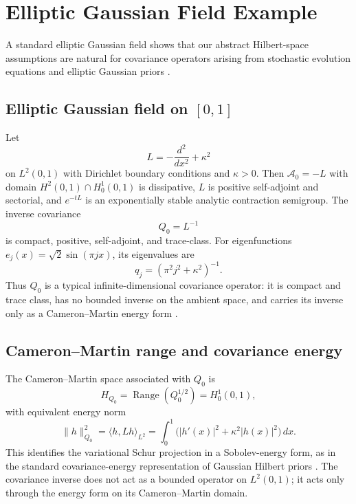 \documentclass[preprint,12pt]{elsarticle}
\theoremstyle{plain}
\theoremstyle{definition}
\theoremstyle{remark}
\begin{document}
    \section{Elliptic Gaussian Field Example}
    \label{sec:spde}

    A standard elliptic Gaussian field shows that our abstract Hilbert-space assumptions are natural for covariance operators arising from stochastic evolution equations and elliptic Gaussian priors \cite{daprato2014stochastic,lord2014introduction,stuart2010inverse,henderson2022sobolev}.

    \subsection{Elliptic Gaussian field on \texorpdfstring{$[0,1]$}{[0,1]}}

    Let
    \[
    L=-\frac{d^2}{dx^2}+\kappa^2
    \]
    on $L^2(0,1)$ with Dirichlet boundary conditions and $\kappa>0$. Then $\mathcal{A}_0=-L$ with domain $H^2(0,1)\cap H_0^1(0,1)$ is dissipative, $L$ is positive self-adjoint and sectorial, and $e^{-tL}$ is an exponentially stable analytic contraction semigroup. The inverse covariance
    \[
    Q_0=L^{-1}
    \]
    is compact, positive, self-adjoint, and trace-class. For eigenfunctions $e_j(x)=\sqrt{2}\sin(\pi jx)$, its eigenvalues are
    \[
    q_j=(\pi^2j^2+\kappa^2)^{-1}.
    \]
    Thus $Q_0$ is a typical infinite-dimensional covariance operator: it is compact and trace class, has no bounded inverse on the ambient space, and carries its inverse only as a Cameron--Martin energy form \cite{bogachev1998gaussian,simon2005trace,henderson2022sobolev}.

    \subsection{Cameron--Martin range and covariance energy}

    The Cameron--Martin space associated with $Q_0$ is
    \[
    H_{Q_0}=\operatorname{Range}(Q_0^{1/2})=H_0^1(0,1),
    \]
    with equivalent energy norm
    \[
    \|h\|_{Q_0}^2
    =\langle h,Lh\rangle_{L^2}
    =\int_0^1 \bigl(|h'(x)|^2+\kappa^2|h(x)|^2\bigr)\,dx.
    \]
    This identifies the variational Schur projection in a Sobolev-energy form, as in the standard covariance-energy representation of Gaussian Hilbert priors \cite{bogachev1998gaussian,stuart2010inverse,henderson2022sobolev}. The covariance inverse does not act as a bounded operator on $L^2(0,1)$; it acts only through the energy form on its Cameron--Martin domain.
\end{document}
